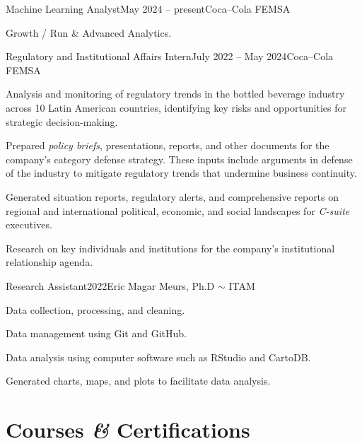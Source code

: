 \documentclass[letter]{resume}
\begin{document}
\begin{content}

\begin{position}{Machine Learning Analyst}{May 2024 -- present}{Coca--Cola FEMSA}{}{}
  \item Growth / Run \& Advanced Analytics.
\end{position}

\begin{position}{Regulatory and Institutional Affairs Intern}{July 2022 -- May 2024}{Coca--Cola FEMSA}{}{}
  \item Analysis and monitoring of regulatory trends in the bottled beverage industry across 10 Latin American countries, identifying key risks and opportunities for strategic decision-making.
  \item Prepared \emph{policy briefs}, presentations, reports, and other documents for the company's category defense strategy. These inputs include arguments in defense of the industry to mitigate regulatory trends that undermine business continuity.
  \item Generated situation reports, regulatory alerts, and comprehensive reports on regional and international political, economic, and social landscapes for \emph{C-suite} executives.
  \item Research on key individuals and institutions for the company's institutional relationship agenda.
\end{position}

\begin{position}{Research Assistant}{2022}{Eric Magar Meurs, Ph.D $\sim$ ITAM}{}{}
  \item Data collection, processing, and cleaning.
  \item Data management using Git and GitHub.
  \item Data analysis using computer software such as RStudio and CartoDB.
  \item Generated charts, maps, and plots to facilitate data analysis.
\end{position}
\vspace{-.1 \baselineskip}

\sectionlineskip
\end{content}


\section{Courses \textbf{\em\&} Certifications} 
\end{document}
